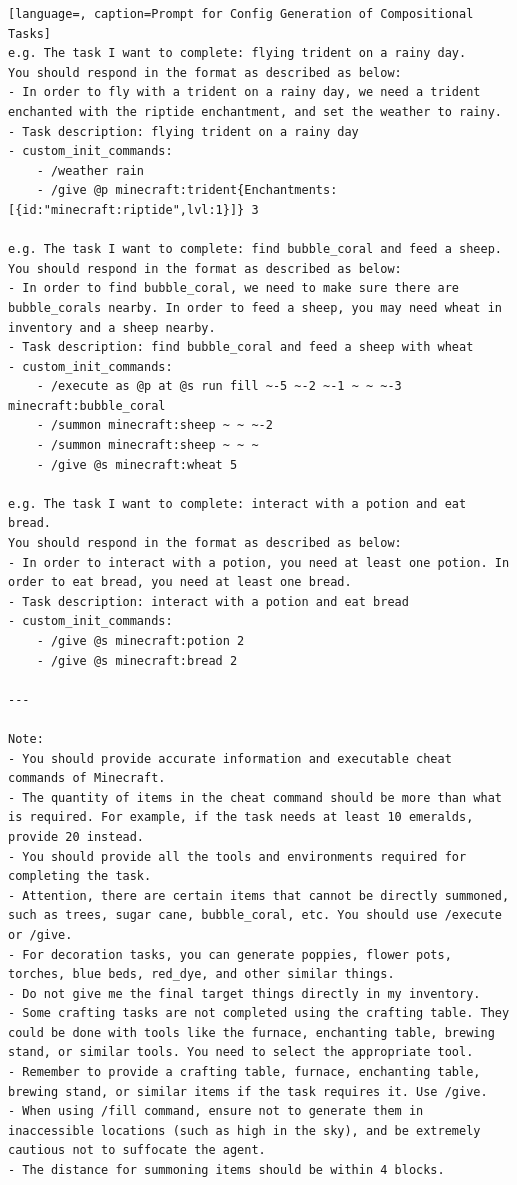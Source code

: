 \begin{lstlisting}[language=, caption=Prompt for Config Generation of Compositional Tasks]
e.g. The task I want to complete: flying trident on a rainy day.  
You should respond in the format as described as below:  
- In order to fly with a trident on a rainy day, we need a trident enchanted with the riptide enchantment, and set the weather to rainy.  
- Task description: flying trident on a rainy day  
- custom_init_commands:  
    - /weather rain  
    - /give @p minecraft:trident{Enchantments:[{id:"minecraft:riptide",lvl:1}]} 3  

e.g. The task I want to complete: find bubble_coral and feed a sheep.  
You should respond in the format as described as below:  
- In order to find bubble_coral, we need to make sure there are bubble_corals nearby. In order to feed a sheep, you may need wheat in inventory and a sheep nearby.  
- Task description: find bubble_coral and feed a sheep with wheat  
- custom_init_commands:  
    - /execute as @p at @s run fill ~-5 ~-2 ~-1 ~ ~ ~-3 minecraft:bubble_coral  
    - /summon minecraft:sheep ~ ~ ~-2  
    - /summon minecraft:sheep ~ ~ ~  
    - /give @s minecraft:wheat 5

e.g. The task I want to complete: interact with a potion and eat bread.  
You should respond in the format as described as below:  
- In order to interact with a potion, you need at least one potion. In order to eat bread, you need at least one bread.  
- Task description: interact with a potion and eat bread  
- custom_init_commands:  
    - /give @s minecraft:potion 2  
    - /give @s minecraft:bread 2

---

Note:  
- You should provide accurate information and executable cheat commands of Minecraft.  
- The quantity of items in the cheat command should be more than what is required. For example, if the task needs at least 10 emeralds, provide 20 instead.  
- You should provide all the tools and environments required for completing the task.  
- Attention, there are certain items that cannot be directly summoned, such as trees, sugar cane, bubble_coral, etc. You should use /execute or /give.  
- For decoration tasks, you can generate poppies, flower pots, torches, blue beds, red_dye, and other similar things.  
- Do not give me the final target things directly in my inventory.  
- Some crafting tasks are not completed using the crafting table. They could be done with tools like the furnace, enchanting table, brewing stand, or similar tools. You need to select the appropriate tool.  
- Remember to provide a crafting table, furnace, enchanting table, brewing stand, or similar items if the task requires it. Use /give.  
- When using /fill command, ensure not to generate them in inaccessible locations (such as high in the sky), and be extremely cautious not to suffocate the agent.  
- The distance for summoning items should be within 4 blocks.
\end{lstlisting}





